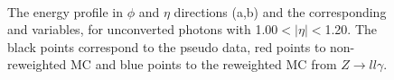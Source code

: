 \begin{figure}[htbp]
    \centering
	 \\
    \caption{The energy profile in $\phi$ and $\eta$ directions (a,b) and the corresponding \Rphi and \Reta variables, for unconverted photons with 1.00$<|\eta|<$1.20. The black points correspond to the pseudo data, red points to non-reweighted MC and blue points to the reweighted MC from $Z\rightarrow ll\gamma$.}
    \label{fig:gamma:ss:reweighting:photon:3dreweighting}
\end{figure}

